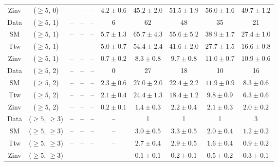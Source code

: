 \begin{table}[h!]
{\begin{tabular}{cccccccccc}
	Zinv & ($\ge5$, 0) & -- & -- & -- & $4.2\pm 0.6$ & $45.2\pm 2.0$ & $51.5\pm 1.9$ & $56.0\pm 1.6$ & $49.7\pm 1.2$ \\[0.5ex] 
	Data & ($\ge5$, 1) & -- & -- & -- & 6 & 62 & 48 & 35 & 21 \\[0.5ex] 
	SM & ($\ge5$, 1) & -- & -- & -- & $5.7\pm 1.3$ & $65.7\pm 4.3$ & $55.6\pm 5.2$ & $38.9\pm 1.7$ & $27.4\pm 1.0$ \\[0.5ex] 
	Ttw & ($\ge5$, 1) & -- & -- & -- & $5.0\pm 0.7$ & $54.4\pm 2.4$ & $41.6\pm 2.0$ & $27.7\pm 1.5$ & $16.6\pm 0.8$ \\[0.5ex] 
	Zinv & ($\ge5$, 1) & -- & -- & -- & $0.7\pm 0.2$ & $8.3\pm 0.8$ & $9.7\pm 0.8$ & $11.0\pm 0.7$ & $10.9\pm 0.6$ \\[0.5ex] 
	Data & ($\ge5$, 2) & -- & -- & -- & 0 & 27 & 18 & 10 & 16 \\[0.5ex] 
	SM & ($\ge5$, 2) & -- & -- & -- & $2.3\pm 0.6$ & $27.0\pm 2.0$ & $22.4\pm 2.2$ & $11.9\pm 0.9$ & $8.3\pm 0.6$ \\[0.5ex] 
	Ttw & ($\ge5$, 2) & -- & -- & -- & $2.1\pm 0.4$ & $24.4\pm 1.3$ & $18.4\pm 1.2$ & $9.8\pm 0.9$ & $6.3\pm 0.6$ \\[0.5ex] 
	Zinv & ($\ge5$, 2) & -- & -- & -- & $0.2\pm 0.1$ & $1.4\pm 0.3$ & $2.2\pm 0.4$ & $2.1\pm 0.3$ & $2.0\pm 0.2$ \\[0.5ex] 
	Data & ($\ge5$, $\ge3$) & -- & -- & -- & -- & 1 & 1 & 1 & 3 \\[0.5ex] 
	SM & ($\ge5$, $\ge3$) & -- & -- & -- & -- & $3.0\pm 0.5$ & $3.3\pm 0.5$ & $2.0\pm 0.4$ & $1.2\pm 0.2$ \\[0.5ex] 
	Ttw & ($\ge5$, $\ge3$) & -- & -- & -- & -- & $2.7\pm 0.4$ & $2.9\pm 0.5$ & $1.6\pm 0.4$ & $0.9\pm 0.2$ \\[0.5ex] 
	Zinv & ($\ge5$, $\ge3$) & -- & -- & -- & -- & $0.1\pm 0.1$ & $0.2\pm 0.1$ & $0.5\pm 0.2$ & $0.3\pm 0.1$ \\[0.5ex] 
	\hline
	\hline
\end{tabular}}
\end{table}

